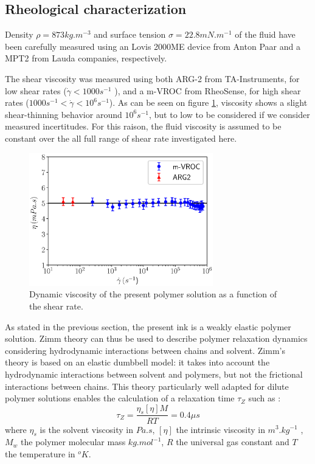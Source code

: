 \documentclass[twocolumn,10pt]{asme2ej}
\begin{document}
\subsection{Rheological characterization}\label{sec:rheo}

Density $\rho = 873 kg.m^{-3}$ and surface tension $\sigma = 22.8 mN.m^{-1}$ of the fluid have been carefully measured using an Lovis 2000ME device from Anton Paar and a MPT2 from Lauda companies, respectively. 

The shear viscosity was measured using both ARG-2 from TA-Instruments, for low shear rates ($\dot{\gamma} < 1000 s^{-1}$ ), and a m-VROC from RheoSense, for high shear rates ($1000 s^{-1}<\dot{\gamma} < 10^6 s^{-1}$). As can be seen on figure \ref{beahaviorLaw}, viscosity shows a slight shear-thinning behavior around $10^6s^{-1}$, but to low to be considered if we consider measured incertitudes. For this raison, the fluid viscosity is assumed to be constant over the all full range of shear rate investigated here.

\begin{figure}[H]
    \centering
    \includegraphics[width=8cm]{./visco.eps}
    \caption{Dynamic viscosity of the present polymer solution as a function of the shear rate.}
    \label{beahaviorLaw}
\end{figure}

As stated in the previous section, the present ink is a weakly elastic polymer solution. Zimm theory \cite{zimm1956dynamics} can thus be used to describe polymer relaxation dynamics considering hydrodynamic interactions between chains and solvent. Zimm's theory is based on an elastic dumbbell model: it takes into account the hydrodynamic interactions between solvent and polymers, but not the frictional interactions between chains.
This theory particularly well adapted for dilute polymer solutions enables the calculation of a relaxation time $\tau_Z$ such as :
\begin{equation}
    \tau_Z = \frac{\eta_s [\eta] M}{RT} = 0.4 \mu s
    \label{zimm} 
\end{equation}
where $\eta_s$ is the solvent viscosity in $Pa.s$, $[\eta]$ the intrinsic viscosity in $m^3.kg^{-1}$ , $M_w$ the polymer molecular mass $kg.mol^{-1}$, $R$ the universal gas constant and $T$ the temperature in $^{o}K$.
\end{document}
